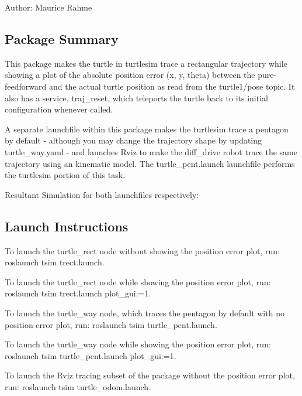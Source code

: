 Author\+: Maurice Rahme

\subsection*{Package Summary}



This package makes the turtle in turtlesim trace a rectangular trajectory while showing a plot of the absolute position error (x, y, theta) between the pure-\/feedforward and the actual turtle position as read from the {\ttfamily turtle1/pose} topic. It also has a service, {\ttfamily traj\+\_\+reset}, which teleports the turtle back to its initial configuration whenever called.

A separate launchfile within this package makes the turtlesim trace a pentagon by default -\/ although you may change the trajectory shape by updating {\ttfamily turtle\+\_\+way.\+yaml} -\/ and launches Rviz to make the {\ttfamily diff\+\_\+drive} robot trace the same trajectory using an kinematic model. The {\ttfamily turtle\+\_\+pent.\+launch} launchfile performs the turtlesim portion of this task.

Resultant Simulation for both launchfiles respectively\+:





\subsection*{Launch Instructions}

To launch the {\ttfamily turtle\+\_\+rect} node without showing the position error plot, run\+: {\ttfamily roslaunch tsim trect.\+launch}.

To launch the {\ttfamily turtle\+\_\+rect} node while showing the position error plot, run\+: {\ttfamily roslaunch tsim trect.\+launch plot\+\_\+gui\+:=1}.

To launch the {\ttfamily turtle\+\_\+way} node, which traces the pentagon by default with no position error plot, run\+: {\ttfamily roslaunch tsim turtle\+\_\+pent.\+launch}.

To launch the {\ttfamily turtle\+\_\+way} node while showing the position error plot, run\+: {\ttfamily roslaunch tsim turtle\+\_\+pent.\+launch plot\+\_\+gui\+:=1}.

To launch the Rviz tracing subset of the package without the position error plot, run\+: {\ttfamily roslaunch tsim turtle\+\_\+odom.\+launch}.

